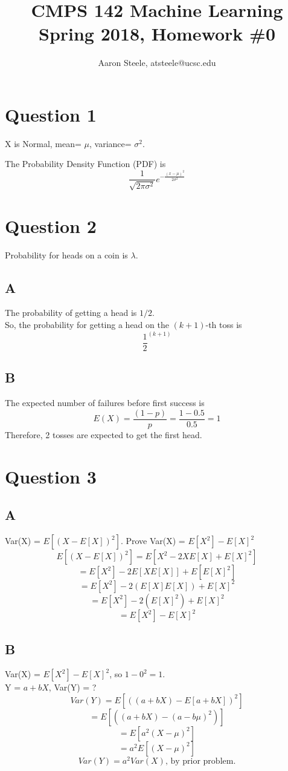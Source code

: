 \documentclass[12pt]{article}
\title{\textbf{CMPS 142 Machine Learning\\ Spring 2018, Homework \#0}}
\date{}
\author{Aaron Steele, atsteele@ucsc.edu}
\begin{document}
	
	\maketitle
	
	\section*{Question 1}
	X is Normal, mean= $\mu$, variance= $\sigma^2$.
	
	The Probability Density Function (PDF) is
	$$\frac{1}{\sqrt{2\pi\sigma^2}} e^{-\frac{(x-\mu)^2}{2\sigma^2}}  $$
	
	
	\section*{Question 2}
	Probability for heads on a coin is $\lambda$.
	
	\subsection*{A}
		The probability of getting a head is $1/2$.\\
		So, the probability for getting a head on the $(k+1)$-th toss is
		$$ \frac{1}{2}^{(k+1)}$$
		
	\subsection*{B}
		The expected number of failures before first success is
		$$E(X) = \frac{(1-p)}{p} = \frac{1-0.5}{0.5} = 1$$
		Therefore, 2 tosses are expected to get the first head.
	
	\section*{Question 3}
	\subsection*{A}
		Var(X) = $E[(X-E[X])^2]$. Prove Var(X) = $E[X^2] - E[X]^2$
		$$ E[(X-E[X])^2] = E[X^2 - 2XE[X] + E[X]^2] $$
		$$ = E[X^2] - 2E[XE[X]] + E[E[X]^2] $$
		$$ = E[X^2] - 2(E[X]E[X]) + E[X]^2 $$
		$$ = E[X^2] - 2(E[X]^2) + E[X]^2$$
		$$ = E[X^2] - E[X]^2$$
		
	\subsection*{B}
		Var(X) = $E[X^2] - E[X]^2$, so $ 1 - 0^2 = 1 $.\\
		Y = $a+bX$, Var(Y) = ?\\
		$$ Var(Y) = E[((a+bX) - E[a+bX])^2] $$
		$$ = E[((a+bX) - (a - b\mu)^2)] $$
		$$ = E[a^2(X-\mu)^2] $$
		$$ = a^2 E[(X-\mu)^2]$$
		$$Var(Y) = a^2 Var(X) \text{, by prior problem.}$$
	
\end{document}
